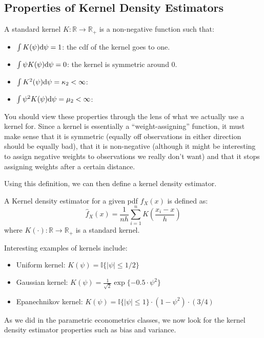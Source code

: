 \subsection{Properties of Kernel Density Estimators}

\begin{definition}
A standard kernel $K: \mathbb{R}\to\mathbb{R}_+$ is a non-negative function such that:\begin{itemize}
\item $\int K(\psi)\mathrm{d} \psi = 1$: the cdf of the kernel goes to one.
\item $\int \psi K(\psi)\mathrm{d} \psi = 0$: the kernel is symmetric around 0.
\item $\int K^2(\psi)\mathrm{d} \psi = \kappa_2 < \infty $:
\item $\int \psi^2 K(\psi)\mathrm{d} \psi = \mu_2 < \infty $: 
\end{itemize}
\end{definition}
You should view these properties through the lens of what we actually use a kernel for. Since a kernel is essentially a ``weight-assigning'' function, it must make sense that it is symmetric (equally off observations in either direction should be equally bad), that it is non-negative (although it might be interesting to assign negative weights to observations we really don't want) and that it stops assigning weights after a certain distance.

Using this definition, we can then define a kernel density estimator.
\begin{definition}
A Kernel density estimator for a given pdf $f_X(x)$ is defined as: $$ \hat f_X(x) = \frac{1}{nh} \sum_{i=1}^{n} K\left(\frac{x_i - x}{h}\right) $$ where $K(\cdot):\mathbb{R}\to\mathbb{R}_+$ is a standard kernel.
\end{definition}

Interesting examples of kernels include:\begin{itemize}
\item Uniform kernel: $K(\psi) = \mathbb{I}\{\vert\psi\vert\leq 1/2\}$
\item Gaussian kernel: $K(\psi) = \frac{1}{\sqrt{2}}\exp\{- 0.5 \cdot \psi^2\}$
\item Epanechnikov kernel: $K(\psi) = \mathbb{I}\{\vert\psi\vert\leq 1\}\cdot (1 - \psi^2)\cdot (3/4) $
\end{itemize}

As we did in the parametric econometrics classes, we now look for the kernel density estimator properties such as bias and variance.


